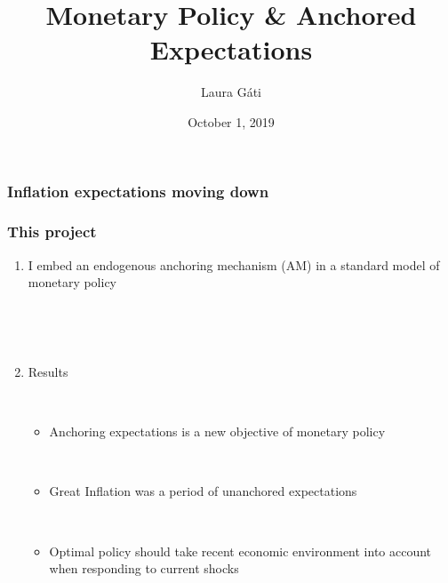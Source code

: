 \documentclass{beamer}
\author[]{Laura G\'ati}
\institute[]{Boston College}
\title[]{Monetary Policy \& Anchored Expectations}
\date[]{October 1, 2019}
\def \myFigPath {../../figures/}
\def\mySmallerFigScale{0.18}
\def\myTinierFigScale{0.12}
\begin{document}
\begin{frame}

\maketitle


\end{frame}



\begin{frame}
	\frametitle{Inflation expectations moving down}

\begin{figure}[h!]
\end{figure}


\end{frame}

\begin{frame}
	\frametitle{}

\begin{figure}[h!]
\end{figure}


\end{frame}



\begin{frame}
	\frametitle{This project}
	
	\begin{enumerate}
	\item[] I embed an endogenous anchoring mechanism (AM) in a standard model of monetary policy
	
	\
	
	\
	
	\item[] Results 
	
	\
	
	\begin{itemize}
	\item Anchoring expectations is a new objective of monetary policy
	
	\
	
	\item Great Inflation was a period of unanchored expectations
	
	\
	
	\item Optimal policy should take recent economic environment into account when responding to current shocks
	\end{itemize}

	
	\
	
	\end{enumerate}


\end{frame}
\end{document}
